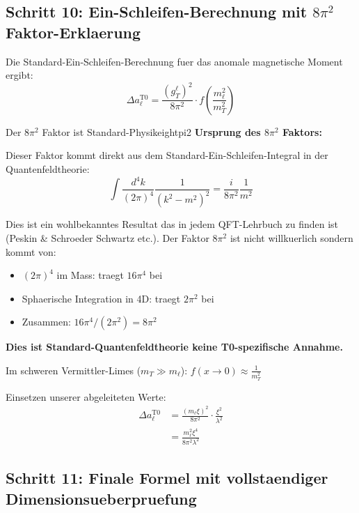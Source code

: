 \documentclass[12pt,a4paper]{article}
\begin{document}
	\subsection{Schritt 10: Ein-Schleifen-Berechnung mit $8\pi^2$ Faktor-Erklaerung}
	
	Die Standard-Ein-Schleifen-Berechnung fuer das anomale magnetische Moment ergibt:
	\begin{equation}
		\Delta a_\ell^{\text{T0}} = \frac{(g_T^\ell)^2}{8\pi^2} \cdot f\left(\frac{m_\ell^2}{m_T^2}\right)
		\label{eq:oneloop_general}
	\end{equation}
	
	\begin{criticism}{Der $8\pi^2$ Faktor ist Standard-Physik}{eightpi2}
		\textbf{Ursprung des $8\pi^2$ Faktors:}
		
		Dieser Faktor kommt direkt aus dem Standard-Ein-Schleifen-Integral in der Quantenfeldtheorie:
		\begin{equation}
			\int \frac{d^4k}{(2\pi)^4} \frac{1}{(k^2 - m^2)^2} = \frac{i}{8\pi^2} \frac{1}{m^2}
		\end{equation}
		
		Dies ist ein wohlbekanntes Resultat das in jedem QFT-Lehrbuch zu finden ist (Peskin \& Schroeder Schwartz etc.). Der Faktor $8\pi^2$ ist nicht willkuerlich sondern kommt von:
		\begin{itemize}
			\item $(2\pi)^4$ im Mass: traegt $16\pi^4$ bei
			\item Sphaerische Integration in 4D: traegt $2\pi^2$ bei  
			\item Zusammen: $16\pi^4/(2\pi^2) = 8\pi^2$
		\end{itemize}
		
		\textbf{Dies ist Standard-Quantenfeldtheorie keine T0-spezifische Annahme.}
	\end{criticism}
	
	Im schweren Vermittler-Limes ($m_T \gg m_\ell$): $f(x \to 0) \approx \frac{1}{m_T^2}$
	
	Einsetzen unserer abgeleiteten Werte:
	\begin{align}
		\Delta a_\ell^{\text{T0}} &= \frac{(m_\ell \xi)^2}{8\pi^2} \cdot \frac{\xi^2}{\lambda^2} \\
		&= \frac{m_\ell^2 \xi^4}{8\pi^2 \lambda^2}
		\label{eq:anomaly_intermediate}
	\end{align}
	
	\subsection{Schritt 11: Finale Formel mit vollstaendiger Dimensionsueberpruefung}
	
\end{document}
